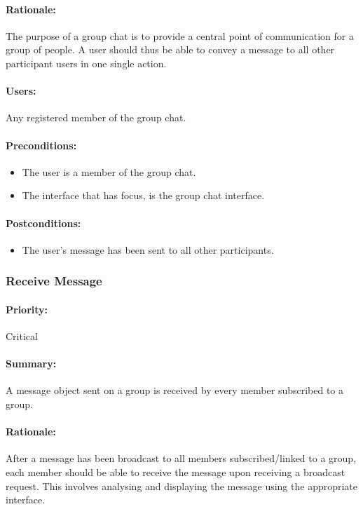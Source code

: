\documentclass[11pt]{article}
\begin{document}
\paragraph{Rationale:} The purpose of a group chat is to provide a central point of communication for a group of people. A user should thus be able to convey a message to all other participant users in one single action.
\paragraph{Users:} Any registered member of the group chat.
\paragraph{Preconditions:} 
\begin{itemize}
\item The user is a member of the group chat.
\item The interface that has focus, is the group chat interface.
\end{itemize}
\paragraph{{Postconditions:}}
\begin{itemize}
\item The user's message has been sent to all other participants.
\end{itemize}

\subsubsection{Receive Message} \label{UC-receive-message}
\paragraph{Priority:} Critical
\paragraph{Summary:} A message object sent on a group is received by every member subscribed to a group.
\paragraph{Rationale:} After a message has been broadcast to all members subscribed/linked to a group, each member should be able to receive the message upon receiving a broadcast request. This involves analysing and displaying the message using the appropriate interface. 
\end{document}

